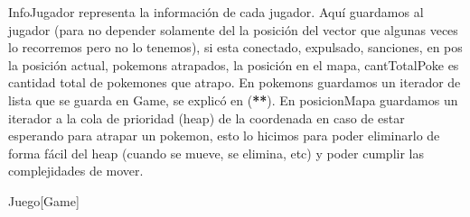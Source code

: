 \begin{Representacion}
InfoJugador representa la informaci\'on de cada jugador. Aqu\'i guardamos al jugador (para no depender solamente del la posici\'on del vector que algunas veces lo recorremos pero no lo tenemos), si esta conectado, expulsado, sanciones, en pos la posici\'on actual, pokemons atrapados, la posici\'on en el mapa, cantTotalPoke es cantidad total de pokemones que atrapo. En pokemons guardamos un iterador  de lista que se guarda en Game, se explic\'o en (\textbf{**}). En posicionMapa guardamos un iterador a la cola de prioridad (heap) de la coordenada en caso de estar esperando para atrapar un pokemon, esto lo hicimos para poder eliminarlo de forma f\'acil del heap (cuando se mueve, se elimina, etc) y poder cumplir las complejidades de mover.


	\begin{Estructura}{Juego}[Game]
		\begin{Tupla}[Game]
		\end{Tupla}
	\end{Estructura}
	
	\begin{Tupla}[InfoJugador]
	\end{Tupla}
	
	
	\begin{Tupla}[InfoCoordenada]
	\end{Tupla}


\end{Representacion}
